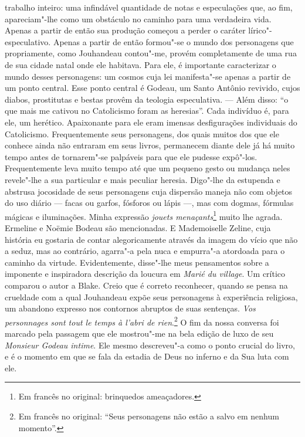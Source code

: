 trabalho inteiro: uma infindável quantidade de notas e especulações que,
ao fim, apareciam"-lhe como um obstáculo no caminho para uma verdadeira
vida. Apenas a partir de então sua produção começou a perder o caráter
lírico"-especulativo. Apenas a partir de então formou"-se o mundo dos
personagens que propriamente, como Jouhandeau contou"-me, provém
completamente de uma rua de sua cidade natal onde ele habitava. Para
ele, é importante caracterizar o mundo desses personagens: um cosmos
cuja lei manifesta"-se apenas a partir de um ponto central. Esse ponto
central é Godeau, um Santo Antônio revivido, cujos diabos, prostitutas e
bestas provêm da teologia especulativa. --- Além disso: ``o que mais me
cativou no Catolicismo foram as heresias''. Cada indivíduo é, para ele,
um herético. Apaixonante para ele eram imensas desfigurações individuais
do Catolicismo. Frequentemente seus personagens, dos quais muitos dos
que ele conhece ainda não entraram em seus livros, permanecem diante
dele já há muito tempo antes de tornarem"-se palpáveis para que ele
pudesse expô"-los. Frequentemente leva muito tempo até que um pequeno
gesto ou mudança neles revele"-lhe a sua particular e mais peculiar
heresia. Digo"-lhe da estupenda e abstrusa jocosidade de seus personagens
cuja dispersão maneja não com objetos do uso diário --- facas ou garfos,
fósforos ou lápis ---, mas com dogmas, fórmulas mágicas e iluminações.
Minha expressão \emph{jouets menaçants}\footnote{Em francês no original: brinquedos
  ameaçadores. \versal{[N. T.]}} muito lhe agrada. Ermeline e
Noëmie Bodeau são mencionadas. E Mademoiselle Zeline, cuja história eu
gostaria de contar alegoricamente através da imagem do vício que não a
seduz, mas ao contrário, agarra"-a pela nuca e empurra"-a atordoada para o
caminho da virtude. Evidentemente, disse"-lhe meus pensamentos sobre a
imponente e inspiradora descrição da loucura em \emph{Marié du village}.
Um crítico comparou o autor a Blake. Creio que é correto reconhecer,
quando se pensa na crueldade com a qual Jouhandeau expõe seus
personagens à experiência religiosa, um abandono expresso nos contornos
abruptos de suas sentenças. \emph{Vos personnages sont tout le temps à
l'abri de rien}.\footnote{Em francês no original: ``Seus personagens não estão a salvo em
  nenhum momento''. \versal{[N. T.]}} O fim da nossa conversa
foi marcado pela passagem que ele mostrou"-me na bela edição de luxo de
seu \emph{Monsieur Godeau intime}. Ele mesmo descreveu"-a como o ponto
crucial do livro, e é o momento em que se fala da estadia de Deus no
inferno e da Sua luta com ele.

